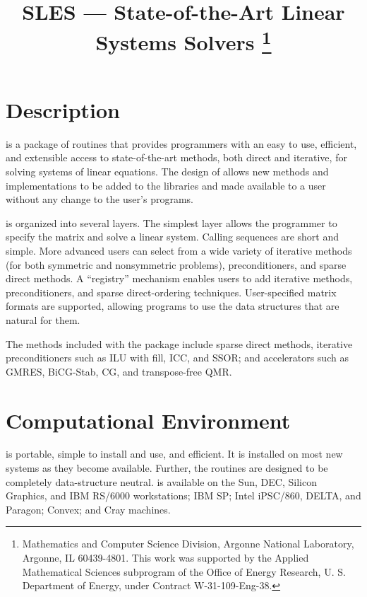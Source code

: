 \documentclass[11pt,epsf,/home/gropp/HPCCP/formats/handpage,../../tex/hyper]{article}
\begin{document}
\pagestyle{empty}
\title{SLES --- State-of-the-Art Linear Systems Solvers
\thanks{Mathematics and Computer Science Division,
Argonne National Laboratory,
Argonne, IL 60439-4801.
This work was supported by the Applied Mathematical
Sciences subprogram of the Office of Energy Research, U. S. Department of
Energy, under Contract W-31-109-Eng-38.}}

\date{}
\maketitle

\section*{Description}

 is a package of routines that 
provides programmers with an easy to use, efficient, and
extensible access to state-of-the-art methods, both direct and iterative,
for solving systems of linear equations.
The design of  allows new methods and implementations to be 
added to the libraries and made available to a user without any change 
to the user's programs.  

 is organized into several layers.  
The simplest layer allows the programmer to specify the matrix and solve
a linear system.
Calling sequences are short and simple.
More advanced users can select from a wide variety of iterative methods
(for both symmetric and nonsymmetric problems), preconditioners, and
sparse direct methods.
A ``registry'' mechanism enables users to add iterative methods,
preconditioners, and sparse direct-ordering techniques.
User-specified matrix formats are supported, allowing programs to
use the data structures that are natural for them.  

The methods included with the package include sparse direct methods,
iterative preconditioners such as ILU with fill, ICC, and SSOR; and 
accelerators such as GMRES, BiCG-Stab, CG, and transpose-free QMR.

\section*{Computational Environment}
 is portable, simple to install and use, and 
efficient.
It is installed on most new systems as they become available.
Further, the routines are designed to be completely data-structure neutral.
 is available on the Sun, DEC, Silicon Graphics, and IBM
RS/6000 workstations; IBM SP; Intel iPSC/860, DELTA, and Paragon;
Convex; and Cray machines.
\end{document}
